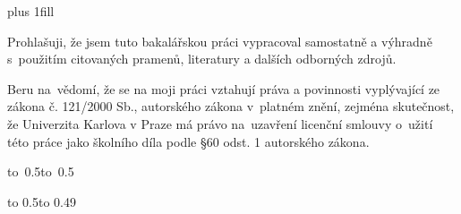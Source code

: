
\newpage

\vglue 0pt plus 1fill

\noindent
Prohlašuji, že jsem tuto bakalářskou práci vypracoval samostatně a výhradně
s~použitím citovaných pramenů, literatury a dalších odborných zdrojů.

\medskip\noindent
Beru na~vědomí, že se na moji práci vztahují práva a povinnosti vyplývající
ze zákona č. 121/2000 Sb., autorského zákona v~platném znění, zejména skutečnost,
že Univerzita Karlova v Praze má právo na~uzavření licenční smlouvy o~užití této
práce jako školního díla podle §60 odst. 1 autorského zákona.

\vspace{10mm}

\hbox{\hbox to 0.5\hbox to 0.5}

\vspace{20mm}
\newpage


\vbox to 0.5\nobreak\vbox to 0.49


